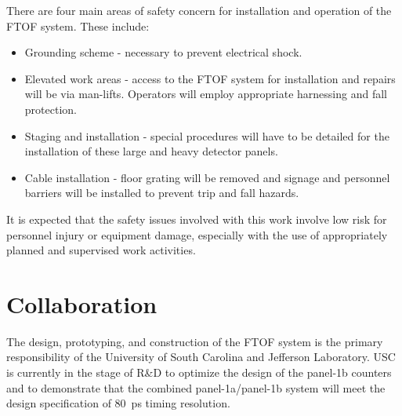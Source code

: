There are four main areas of safety concern for installation and operation
of the FTOF system.  These include:

\begin{itemize}

\item Grounding scheme - necessary to prevent electrical shock.

\item Elevated work areas - access to the FTOF system for installation
and repairs will be via man-lifts.  Operators will employ appropriate
harnessing and fall protection.

\item Staging and installation - special procedures will have to be 
detailed for the installation of these large and heavy detector panels.

\item Cable installation - floor grating will be removed and signage
and personnel barriers will be installed to prevent trip and fall
hazards.

\end{itemize}

It is expected that the safety issues involved with this work involve
low risk for personnel injury or equipment damage, especially with the
use of appropriately planned and supervised work activities.

\section{Collaboration}

The design, prototyping, and construction of the FTOF system is the
primary responsibility of the University of South Carolina and
Jefferson Laboratory.  USC is currently in the stage of R\&D to optimize 
the design of the panel-1b counters and to demonstrate that the combined 
panel-1a/panel-1b system will meet the design specification of 80~ps 
timing resolution. 
